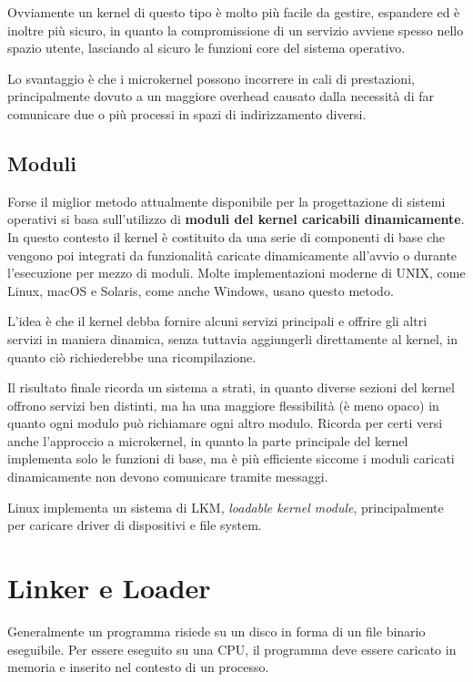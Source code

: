         Ovviamente un kernel di questo tipo è molto più facile da gestire, espandere ed è inoltre più sicuro, in quanto la compromissione di un servizio avviene spesso nello spazio utente, lasciando al sicuro le funzioni core del sistema operativo.
        
        Lo svantaggio è che i microkernel possono incorrere in cali di prestazioni, principalmente dovuto a un maggiore overhead causato dalla necessità di far comunicare due o più processi in spazi di indirizzamento diversi.
        
    \subsection{Moduli}
        Forse il miglior metodo attualmente disponibile per la progettazione di sistemi operativi si basa sull'utilizzo di \textbf{moduli del kernel caricabili dinamicamente}. In questo contesto il kernel è costituito da una serie di componenti di base che vengono poi integrati da funzionalità caricate dinamicamente all'avvio o durante l'esecuzione per mezzo di moduli. Molte implementazioni moderne di UNIX, come Linux, macOS e Solaris, come anche Windows, usano questo metodo.
        
        L'idea è che il kernel debba fornire alcuni servizi principali e offrire gli altri servizi in maniera dinamica, senza tuttavia aggiungerli direttamente al kernel, in quanto ciò richiederebbe una ricompilazione.
        
        Il risultato finale ricorda un sistema a strati, in quanto diverse sezioni del kernel offrono servizi ben distinti, ma ha una maggiore flessibilità (è meno opaco) in quanto ogni modulo può richiamare ogni altro modulo. Ricorda per certi versi anche l'approccio a microkernel, in quanto la parte principale del kernel implementa solo le funzioni di base, ma è più efficiente siccome i moduli caricati dinamicamente non devono comunicare tramite messaggi.
        
        Linux implementa un sistema di LKM, \textit{loadable kernel module}, principalmente per caricare driver di dispositivi e file system.
        
\section{Linker e Loader}
    Generalmente un programma risiede su un disco in forma di un file binario eseguibile. Per essere eseguito su una CPU, il programma deve essere caricato in memoria e inserito nel contesto di un processo.
    
